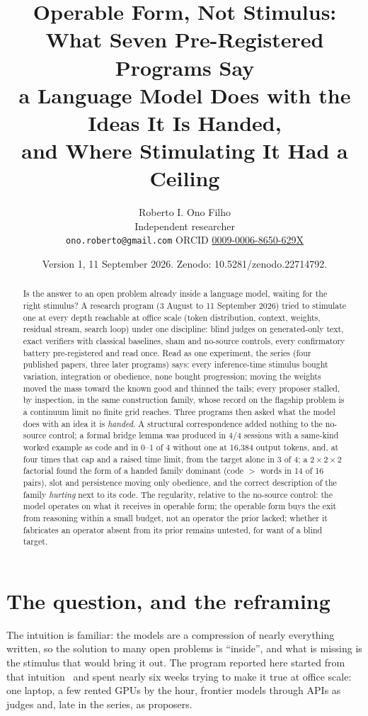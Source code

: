 \documentclass[11pt]{article}
\title{Operable Form, Not Stimulus:\\
What Seven Pre-Registered Programs Say\\
a Language Model Does with the Ideas It Is Handed,\\
and Where Stimulating It Had a Ceiling}
\author{Roberto I. Ono Filho\\ Independent researcher\\
\texttt{ono.roberto@gmail.com} \quad ORCID \href{https://orcid.org/0009-0006-8650-629X}{0009-0006-8650-629X}}
\date{\small Version 1, 11 September 2026. Zenodo: 10.5281/zenodo.22714792.}
\begin{document}
\maketitle

\begin{abstract}
Is the answer to an open problem already inside a language model, waiting
for the right stimulus? A research program (3 August to 11 September 2026)
tried to stimulate one at every depth reachable at office scale (token
distribution, context, weights, residual stream, search loop) under one
discipline: blind judges on generated-only text, exact verifiers with
classical baselines, sham and no-source controls, every confirmatory
battery pre-registered and read once. Read as one experiment, the series
(four published papers, three later programs) says: every inference-time
stimulus bought variation, integration or obedience, none bought
progression; moving the weights moved the mass toward the known good and
thinned the tails; every proposer stalled, by inspection, in the same
construction family, whose record on the flagship problem is a continuum
limit no finite grid reaches. Three programs then asked what the model does
with an idea it is \emph{handed}. A structural correspondence added nothing
to the no-source control; a formal bridge lemma was produced in 4/4
sessions with a same-kind worked example as code and in 0--1 of 4 without
one at 16{,}384 output tokens, and, at four times that cap and a raised
time limit, from the target alone in 3 of 4; a $2\times2\times2$ factorial
found the form of a handed family dominant (code $>$ words in 14 of 16
pairs), slot and persistence moving only obedience, and the correct
description of the family \emph{hurting} next to its code. The regularity,
relative to the no-source control: the model operates on what it receives
in operable form; the operable form buys the exit from reasoning within a
small budget, not an operator the prior lacked; whether it fabricates an
operator absent from its prior remains untested, for want of a blind
target.
\end{abstract}

\section{The question, and the reframing}
\label{sec:question}

The intuition is familiar: the models are a compression of nearly
everything written, so the solution to many open problems is ``inside'', and
what is missing is the stimulus that would bring it out. The program
reported here started from that intuition~\citep{ono2026interrupting} and
spent nearly six weeks trying to make it true at office scale: one
laptop, a few rented GPUs by the hour, frontier models through APIs as
judges and, late in the series, as proposers.
\end{document}
